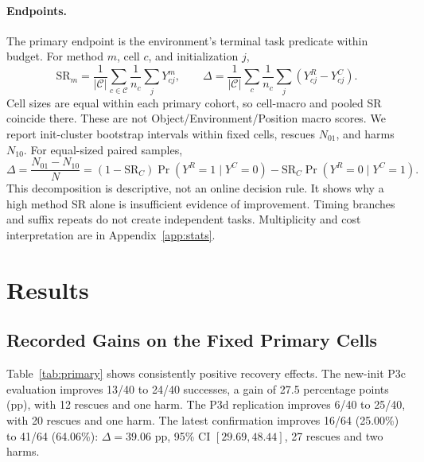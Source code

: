 \documentclass{article}
\begin{document}
\paragraph{Endpoints.}
The primary endpoint is the environment's terminal task predicate within
budget. For method $m$, cell $c$, and initialization $j$,
\begin{equation}
\mathrm{SR}_m=\frac1{|\mathcal C|}\sum_{c\in\mathcal C}
\frac1{n_c}\sum_jY^m_{cj},\qquad
\Delta=\frac1{|\mathcal C|}\sum_c\frac1{n_c}
\sum_j(Y^R_{cj}-Y^C_{cj}).
\label{eq:effect}
\end{equation}
Cell sizes are equal within each primary cohort, so cell-macro and pooled
SR coincide there. These are not Object/Environment/Position macro scores.
We report init-cluster bootstrap intervals within fixed cells,
rescues $N_{01}$, and harms $N_{10}$. For equal-sized paired samples,
\begin{equation}
\Delta=\frac{N_{01}-N_{10}}N
=(1-\mathrm{SR}_C)\Pr(Y^R=1\mid Y^C=0)
-\mathrm{SR}_C\Pr(Y^R=0\mid Y^C=1).
\label{eq:rescue}
\end{equation}
This decomposition is descriptive, not an online decision rule.
It shows why a high method SR alone is insufficient evidence of improvement.
Timing branches and suffix repeats do not create independent tasks.
Multiplicity and cost interpretation are in Appendix~\ref{app:stats}.

\section{Results}
\subsection{Recorded Gains on the Fixed Primary Cells}
\begin{table}[t]
\caption{Gated RGB recovery versus matched H8 on the same eight primary cells.
Rows are separate historical evaluations, not a combined sample or completed
v2 replications. Intervals describe paired gain in percentage points;
R/H denotes rescues/harms.}
\label{tab:primary}
\centering\small
\end{table}
Table~\ref{tab:primary} shows consistently positive recovery effects.
The new-init P3c evaluation improves 13/40 to 24/40 successes,
a gain of 27.5 percentage points (pp), with 12 rescues and one harm.
The P3d replication improves 6/40 to 25/40, with 20 rescues and one harm.
The latest confirmation improves 16/64 (25.00\%) to 41/64 (64.06\%):
$\Delta=39.06$ pp, 95\% CI $[29.69,48.44]$, 27 rescues and two harms.
\end{document}
